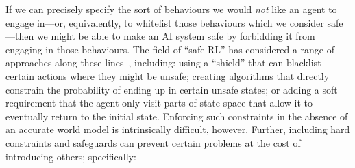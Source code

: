 \documentclass[11pt]{article}
\begin{document}
If we can precisely specify the sort of behaviours we would \textit{not} like an
agent to engage in---or, equivalently, to whitelist those behaviours which we
consider safe---then we might be able to make an AI system safe by forbidding it
from engaging in those behaviours.
%
The field of ``safe RL'' has considered a range of approaches along these
lines~\cite{garcia15comprehensive}, including: using a ``shield'' that can
blacklist certain actions where they might be unsafe; creating algorithms that
directly constrain the probability of ending up in certain unsafe states; or
adding a soft requirement that the agent only visit parts of state space that
allow it to eventually return to the initial state.
%
Enforcing such constraints in the absence of an accurate world model is
intrinsically difficult, however.
%
Further, including hard constraints and safeguards can prevent certain problems
at the cost of introducing others; specifically:
%
\end{document}

